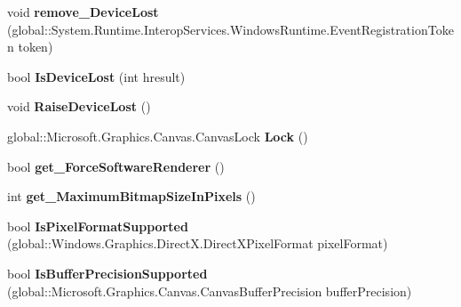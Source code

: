 \begin{DoxyCompactItemize}
void {\bfseries remove\+\_\+\+Device\+Lost} (global\+::\+System.\+Runtime.\+Interop\+Services.\+Windows\+Runtime.\+Event\+Registration\+Token token)
\item 
\mbox{\label{interface_microsoft_1_1_graphics_1_1_canvas_1_1_i_canvas_device_adb664badebd02d30b2beead4a270a634}} 
bool {\bfseries Is\+Device\+Lost} (int hresult)
\item 
\mbox{\label{interface_microsoft_1_1_graphics_1_1_canvas_1_1_i_canvas_device_a6b74db4223ca531731fcff1891a390d8}} 
void {\bfseries Raise\+Device\+Lost} ()
\item 
\mbox{\label{interface_microsoft_1_1_graphics_1_1_canvas_1_1_i_canvas_device_ac7789f0058908fdfff7cf83b25227a23}} 
global\+::\+Microsoft.\+Graphics.\+Canvas.\+Canvas\+Lock {\bfseries Lock} ()
\item 
\mbox{\label{interface_microsoft_1_1_graphics_1_1_canvas_1_1_i_canvas_device_a71ebd55a219b2267a83a68fa3caf42a0}} 
bool {\bfseries get\+\_\+\+Force\+Software\+Renderer} ()
\item 
\mbox{\label{interface_microsoft_1_1_graphics_1_1_canvas_1_1_i_canvas_device_a898fb605ef7e1454030d832f6091f198}} 
int {\bfseries get\+\_\+\+Maximum\+Bitmap\+Size\+In\+Pixels} ()
\item 
\mbox{\label{interface_microsoft_1_1_graphics_1_1_canvas_1_1_i_canvas_device_a1bbc8a4c7b32d66babc6a466f3947580}} 
bool {\bfseries Is\+Pixel\+Format\+Supported} (global\+::\+Windows.\+Graphics.\+Direct\+X.\+Direct\+X\+Pixel\+Format pixel\+Format)
\item 
\mbox{\label{interface_microsoft_1_1_graphics_1_1_canvas_1_1_i_canvas_device_acfa5f7ea5e23895e632195b070bb4023}} 
bool {\bfseries Is\+Buffer\+Precision\+Supported} (global\+::\+Microsoft.\+Graphics.\+Canvas.\+Canvas\+Buffer\+Precision buffer\+Precision)

\end{DoxyCompactItemize}
